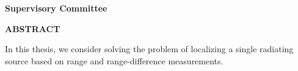 \newpage
{}

\noindent \textbf{Supervisory Committee}
\tpbreak
\panel

\begin{center}
\textbf{ABSTRACT}
\end{center}

In this thesis, we consider solving the   problem of localizing a single radiating source based on range and range-difference measurements. 
